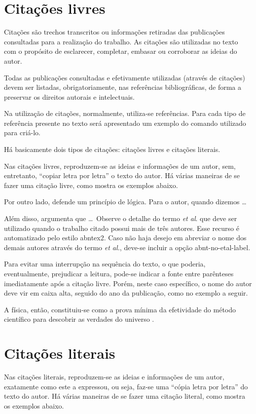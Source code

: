 \section{Citações livres}\label{citacoesLivres}
Citações são trechos transcritos ou informações retiradas das publicações consultadas para a realização do trabalho.
As citações são utilizadas no texto com o propósito de esclarecer, completar, embasar ou corroborar as ideias do autor.

Todas as publicações consultadas e efetivamente utilizadas (através de citações) devem ser listadas, obrigatoriamente, nas referências bibliográficas, de forma a preservar os direitos autorais e intelectuais.

Na utilização de citações, normalmente, utiliza-se referências.
Para cada tipo de referência presente no texto será apresentado um exemplo do comando utilizado para criá-lo.

Há basicamente dois tipos de citações: citações livres e citações literais.

Nas citações livres, reproduzem-se as ideias e informações de um autor, sem, entretanto, ``copiar letra por letra'' o texto do autor.
Há várias maneiras de se fazer uma citação livre, como mostra os exemplos abaixo.

Por outro lado,  defende um princípio de lógica.
Para o autor, quando dizemos \ldots

Além disso,  argumenta que \ldots\mbox{ }Observe o detalhe do termo \textit{et al}.
que deve ser utilizado quando o trabalho citado possui mais de três autores.
Esse recurso é automatizado pelo estilo {\ttfamily abntex2}.
Caso não haja desejo em abreviar o nome dos demais autores através do termo \textit{et al.}, deve-se incluir a opção {\ttfamily abnt-no-etal-label}.

Para evitar uma interrupção na sequência do texto, o que poderia, eventualmente, prejudicar a leitura, pode-se indicar a fonte entre parênteses imediatamente após a citação livre.
Porém, neste caso específico, o nome do autor deve vir em caixa alta, seguido do ano da publicação, como no exemplo a seguir.

A física, então, constituiu-se como a prova mínima da efetividade do método científico para descobrir as verdades do universo \cite{teste:2004,maturana:2003}.


\section{Citações literais}\label{citacoesLiterais}
Nas citações literais, reproduzem-se as ideias e informações de um autor, exatamente como este a expressou, ou seja, faz-se uma ``cópia letra por letra'' do texto do autor.
Há várias maneiras de se fazer uma citação literal, como mostra os exemplos abaixo.

